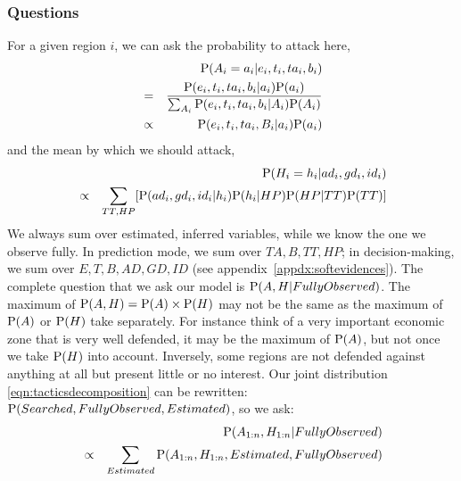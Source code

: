 \subsubsection{Questions}
For a given region $i$, we can ask the probability to attack here,
\begin{eqnarray}
& & \mathrm{P}(A_i=a_i|e_i,t_i,ta_i,b_i)\\
& = &\frac{\mathrm{P}(e_i,t_i,ta_i,b_i|a_i)\mathrm{P}(a_i)}{\sum_{A_i}\mathrm{P}(e_i,t_i,ta_i,b_i|A_i)\mathrm{P}(A_i)}\\
& \propto & \mathrm{P}(e_i,t_i,ta_i,B_i|a_i)\mathrm{P}(a_i)
\end{eqnarray}
and the mean by which we should attack,
\begin{eqnarray}
& & \mathrm{P}(H_i=h_i|ad_i,gd_i,id_i) \\
& \propto & \sum_{TT,HP}[\mathrm{P}(ad_i,gd_i,id_i|h_i)\mathrm{P}(h_i|HP)\mathrm{P}(HP|TT)\mathrm{P}(TT)]
\end{eqnarray}
We always sum over estimated, inferred variables, while we know the one we observe fully. In prediction mode, we sum over $TA,B,TT,HP$; in decision-making, we sum over $E,T,B,AD,GD,ID$ (see appendix~\ref{appdx:softevidences}). 
The complete question that we ask our model is $\mathrm{P}(A,H|FullyObserved)$. The maximum of $\mathrm{P}(A,H)=\mathrm{P}(A)\times \mathrm{P}(H)$ may not be the same as the maximum of $\mathrm{P}(A)$ or $\mathrm{P}(H)$ take separately. For instance think of a very important economic zone that is very well defended, it may be the maximum of $\mathrm{P}(A)$, but not once we take $\mathrm{P}(H)$ into account. Inversely, some regions are not defended against anything at all but present little or no interest. Our joint distribution \ref{eqn:tacticsdecomposition} can be rewritten: $\mathrm{P}(Searched,FullyObserved,Estimated)$, so we ask:
\begin{eqnarray}
& & \mathrm{P}(A_{1:n},H_{1:n}|FullyObserved) \label{eqn:tacticsquestion}\\
& \propto & \sum_{Estimated}\mathrm{P}(A_{1:n},H_{1:n},Estimated,FullyObserved)
\end{eqnarray}

